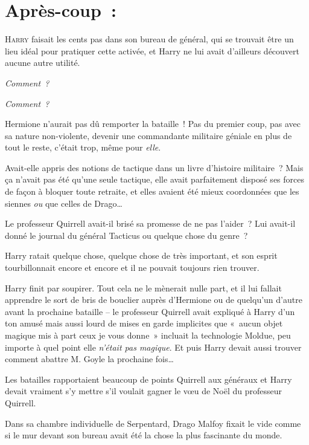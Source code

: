 
\section{Après-coup~:}

\lettrine{H}{arry} faisait les cents pas dans son bureau de général, qui se trouvait être un lieu idéal pour pratiquer cette activée, et Harry ne lui avait d'ailleurs découvert aucune autre utilité.

\emph{Comment~?}

\emph{Comment~?}

Hermione n'aurait pas dû remporter la bataille~! Pas du premier coup, pas avec sa nature non-violente, devenir une commandante militaire géniale en plus de tout le reste, c'était trop, même pour \emph{elle}.

Avait-elle appris des notions de tactique dans un livre d'histoire militaire~? Mais ça n'avait pas été qu'une seule tactique, elle avait parfaitement disposé ses forces de façon à bloquer toute retraite, et elles avaient été mieux coordonnées que les siennes \emph{ou} que celles de Drago…

Le professeur Quirrell avait-il brisé sa promesse de ne pas l'aider~? Lui avait-il donné le journal du général Tacticus ou quelque chose du genre~?

Harry ratait quelque chose, quelque chose de très important, et son esprit tourbillonnait encore et encore et il ne pouvait toujours rien trouver.

Harry finit par soupirer. Tout cela ne le mènerait nulle part, et il lui fallait apprendre le sort de bris de bouclier auprès d'Hermione ou de quelqu'un d'autre avant la prochaine bataille -- le professeur Quirrell avait expliqué à Harry d'un ton amusé mais aussi lourd de mises en garde implicites que «~aucun objet magique mis à part ceux je vous donne~» incluait la technologie Moldue, peu importe à quel point elle \emph{n'était pas magique}. Et puis Harry devait aussi trouver comment abattre M. Goyle la prochaine fois…

Les batailles rapportaient beaucoup de points Quirrell aux généraux et Harry devait vraiment s'y mettre s'il voulait gagner le vœu de Noël du professeur Quirrell.

\later

Dans sa chambre individuelle de Serpentard, Drago Malfoy fixait le vide comme si le mur devant son bureau avait été la chose la plus fascinante du monde.

